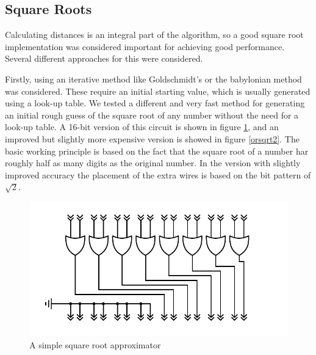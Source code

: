 		\subsection{Square Roots}

			Calculating distances is an integral part of the algorithm, so a
			good square root implementation was considered important for
			achieving good performance. Several different approaches for this
			were considered.

			Firstly, using an iterative method like Goldschmidt's or the
			babylonian method was considered. These require an initial starting
			value, which is usually generated using a look-up table. We tested
			a different and very fast method for generating an initial rough
			guess of the square root of any number without the need for a
			look-up table. A 16-bit version of this circuit is shown in figure
			\ref{orsqrt}, and an improved but slightly more expensive version
			is showed in figure \ref{orsqrt2}.  The basic working principle is
			based on the fact that the square root of a number har roughly half
			as many digits as the original number. In the version with slightly
			improved accuracy the placement of the extra wires is based on the
			bit pattern of $\sqrt{2}$.

			\begin{figure}
				\centering
				\caption{A simple square root approximator}
				\label{orsqrt}
				\includegraphics[width=0.75\linewidth]{figure/pdf/simpleOr.pdf} 
			\end{figure}

